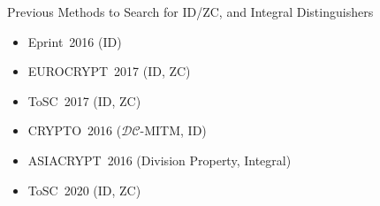 \documentclass[table,aspectratio=169]{beamer}
\newcommand{\Dist}{_{\textsc{d}}} %
\begin{document}


\begin{frame}{Previous Methods to Search for ID/ZC, and Integral Distinguishers}
\begin{itemize}
  \item Eprint~2016 (ID) \cite{eprint_Cui}
  \item EUROCRYPT~2017 (ID, ZC) \cite{eurocrypt_SasakiTodo2017}
  \item ToSC~2017 (ID, ZC) \cite{tosc_SunGLYTQH2017}
  \item CRYPTO~2016 ($\mathcal{DC}$-MITM, ID) \cite{crypto_DerbezF16}
  \item ASIACRYPT~2016 (Division Property, Integral) \cite{asiacrypt_XiangZBL16}
  \item ToSC~2020 (ID, ZC) \cite{tosc_SunGWW2020}
\end{itemize}
\end{frame}
\end{document}
